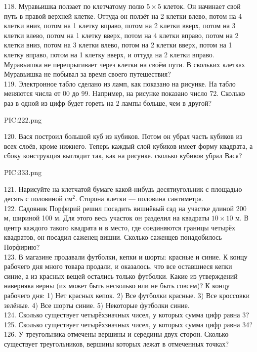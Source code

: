 118. Муравьишка ползает по клетчатому полю $5\times5$ клеток. Он начинает свой путь в правой верхней клетке. Оттуда он ползёт на 2 клетки влево, потом на 4 клетки вниз, потом на 1 клетку вправо, потом на 2 клетки вверх, потом на 3 клетки влево, потом на 1 клетку вверх, потом на 4 клетки вправо, потом на 2 клетки вниз, потом на 3 клетки влево, потом на 2 клетки вверх, потом на 1 клетку вправо, потом на 1 клетку вверх, и оттуда на 2 клетки вправо. Муравьишка не перепрыгивает через клетки на своём пути. В скольких клетках Муравьишка не побывал за время своего путешествия?\\
119. Электронное табло сделано из ламп, как показано на рисунке. На табло меняются числа от 00 до 99. Например, на рисунке показано число 72. Сколько раз в одной из цифр будет гореть на 2 лампы больше, чем в другой?
\begin{center}
{{PIC:222.png}}
\end{center}
120. Вася построил большой куб из кубиков. Потом он убрал часть кубиков из всех слоёв, кроме нижнего. Теперь каждый слой кубиков имеет форму квадрата, а сбоку конструкция выглядит так, как на рисунке. сколько кубиков убрал Вася?
\begin{center}
{{PIC:333.png}}
\end{center}
121. Нарисуйте на клетчатой бумаге какой-нибудь десятиугольник с площадью десять с половиной $\text{см}^2.$ Сторона клетки --- половина сантиметра.\\
122. Садовник Порфирий решил посадить вишнёвый сад на участке длиной 200 м, шириной 100 м. Для этого весь участок он разделил на квадраты $10\times10$ м. В центр каждого такого квадрата и в место, где соединяются границы четырёх квадратов, он посадил саженец вишни. Сколько саженцев понадобилось Порфирию?\\
123. В магазине продавали футболки, кепки и шорты: красные и синие. К концу рабочего дня много товара продали, и оказалось, что все оставшиеся кепки синие, а из красных вещей остались только футболки. Какие из утверждений наверняка верны (их может быть несколько или не быть совсем)? К концу рабочего дня: 1) Нет красных кепок. 2) Все футболки красные. 3) Все кроссовки зелёные. 4) Все шорты синие. 5) Некоторые футболки синие.\\
124. Сколько существует четырёхзначных чисел, у которых сумма цифр равна 3?\\
125. Сколько существует четырёхзначных чисел, у которых сумма цифр равна 34?\\
126. У треугольника отмечены вершины и середины двух сторон. Сколько существует треугольников, вершины которых лежат в отмеченных точках?\\
